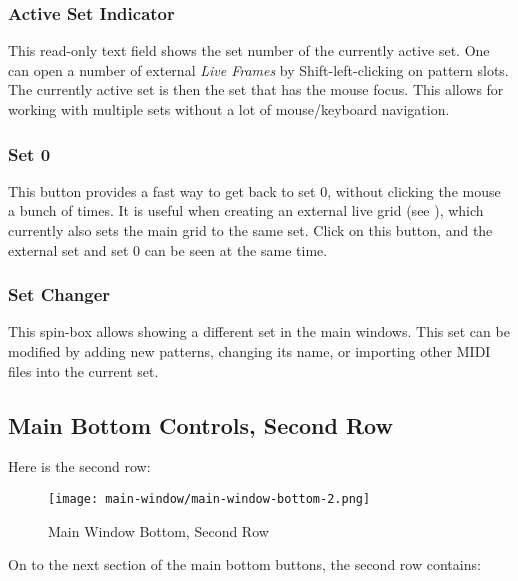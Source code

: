 \subsubsection{Active Set Indicator}
\label{subsubsec:introduction_active_set_indicator}

   This read-only text field shows the set number of the currently active set.
   One can open a number of external \textsl{Live Frames} by
   Shift-left-clicking on pattern slots.  The currently active set is then the
   set that has the mouse focus.  This allows for working with multiple sets
   without a lot of mouse/keyboard navigation.

\subsubsection{Set 0}
\label{subsubsec:introduction_set_zero}

   This button provides a fast way to get back to set 0, without clicking the
   mouse a bunch of times.
   It is useful when creating an external live grid
   (see ),
   which currently also sets the main grid to the same set.
   Click on this button, and the external set and set 0 can be seen at the same
   time.

\subsubsection{Set Changer}
\label{subsubsec:introduction_set_changer}

   This spin-box allows showing a different set in the main windows.
   This set can be modified by adding new patterns, changing its name, or
   importing other MIDI files into the current set.

\subsection{Main Bottom Controls, Second Row}
\label{subsec:introduction_main_bottom_controls_2}

   Here is the second row:

\begin{figure}[H]
   \centering 
   \texttt{[image: main-window/main-window-bottom-2.png]}
   \caption{Main Window Bottom, Second Row}
   \label{fig:main_window_bottom_2}
\end{figure}

   On to the next section of the main bottom buttons, the second row contains:

